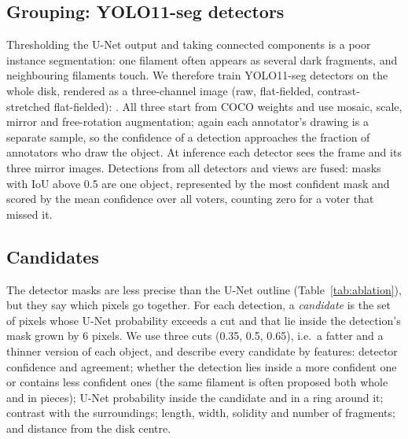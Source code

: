 \documentclass[sigconf]{acmart}
\begin{document}
\subsection{Grouping: YOLO11-seg detectors}
    Thresholding the U-Net output and taking connected components is a poor instance segmentation: one filament often appears as several dark fragments, and neighbouring filaments touch. We therefore train YOLO11-seg detectors \cite{yolo11} on the whole disk, rendered as a three-channel image (raw, flat-fielded, contrast-stretched flat-fielded): \detectorList{}. All three start from COCO weights and use mosaic, scale, mirror and free-rotation augmentation; again each annotator's drawing is a separate sample, so the confidence of a detection approaches the fraction of annotators who draw the object. At inference each detector sees the frame and its three mirror images. Detections from all detectors and views are fused: masks with IoU above 0.5 are one object, represented by the most confident mask and scored by the mean confidence over all voters, counting zero for a voter that missed it.

\subsection{Candidates}
    The detector masks are less precise than the U-Net outline (Table~\ref{tab:ablation}), but they say which pixels go together. For each detection, a \emph{candidate} is the set of pixels whose U-Net probability exceeds a cut and that lie inside the detection's mask grown by 6 pixels. We use three cuts (0.35, 0.5, 0.65), i.e.\ a fatter and a thinner version of each object, and describe every candidate by \nFeatures{} features: detector confidence and agreement; whether the detection lies inside a more confident one or contains less confident ones (the same filament is often proposed both whole and in pieces); U-Net probability inside the candidate and in a ring around it; contrast with the surroundings; length, width, solidity and number of fragments; and distance from the disk centre.
\end{document}
